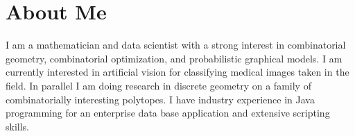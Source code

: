  
\section{\sc  About Me}

I am a mathematician and data scientist with a strong interest in combinatorial geometry, combinatorial optimization, and probabilistic graphical models.  I am currently interested in artificial vision for classifying medical images taken in the field. In parallel I am doing research in discrete geometry on a family of combinatorially interesting polytopes. I have industry experience in Java programming for an enterprise data base application and extensive scripting skills.  

